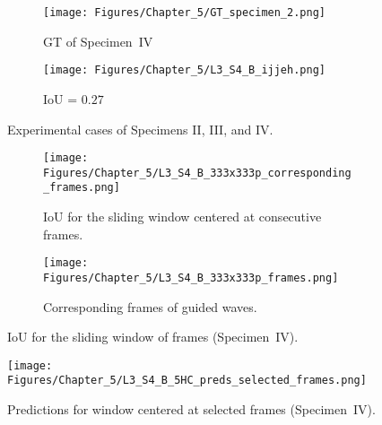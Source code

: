 \begin{figure} [!h]
	\begin{subfigure}[b]{0.47\textwidth}
		\centering
		\texttt{[image: Figures/Chapter\_5/GT\_specimen\_2.png]}
		\caption{GT of Specimen~IV}
		\label{fig:gt_specimen_4}
	\end{subfigure}
	\hfill
	\begin{subfigure}[b]{0.47\textwidth}
		\centering
		\texttt{[image: Figures/Chapter\_5/L3\_S4\_B\_ijjeh.png]}
		\caption{IoU = \(0.27\)} 
		\label{fig:L3_S4_B_ijjeh}
	\end{subfigure}
	\caption{Experimental cases of Specimens II, III, and IV.}
	\label{fig:exp_case}
\end{figure} 
\begin{figure} [!h]
	\centering
	\begin{subfigure}[b]{1\textwidth}
		\centering
		\texttt{[image: Figures/Chapter\_5/L3\_S4\_B\_333x333p\_corresponding\_frames.png]}
		\caption{IoU for the sliding window centered at consecutive frames.}
		\label{fig:L3_S4_B_333x333p_corresponding_frames}
	\end{subfigure}
	\par\medskip
	\begin{subfigure}[b]{1\textwidth}
		\centering
		\texttt{[image: Figures/Chapter\_5/L3\_S4\_B\_333x333p\_frames.png]}
		\caption{Corresponding frames of guided waves.} 
		\label{fig:L3_S4_B_333x333p_frames}
	\end{subfigure}
	\caption{IoU for the sliding window of frames (Specimen~IV).}
	\label{fig:L3_S4_B_333x333p_50kHz_5HC_IoU_centre_window}
\end{figure} 
\begin{figure}[!h]
	\centering
	\texttt{[image: Figures/Chapter\_5/L3\_S4\_B\_5HC\_preds\_selected\_frames.png]}
	\caption{Predictions for window centered at selected frames (Specimen~IV).}
	\label{fig:L3_S4_B_5HC_preds_selected_frames}
\end{figure}

